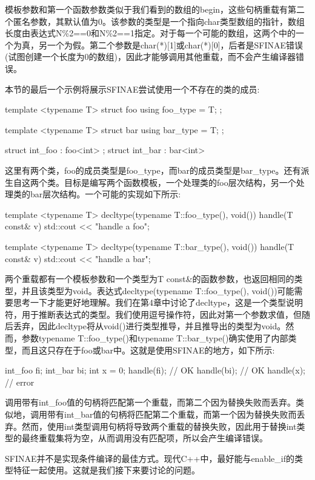 模板参数和第一个函数参数类似于我们看到的数组的begin，这些句柄重载有第二个匿名参数，其默认值为0。该参数的类型是一个指向char类型数组的指针，数组长度由表达式N\%2==0和N\%2==1指定。对于每一个可能的数组，这两个中的一个为真，另一个为假。第二个参数是char(*)[1]或char(*)[0]，后者是SFINAE错误(试图创建一个长度为0的数组)，因此才能够调用其他重载，而不会产生编译器错误。

本节的最后一个示例将展示SFINAE尝试使用一个不存在的类的成员:

\begin{cpp}
template <typename T>
struct foo
{
	using foo_type = T;
};

template <typename T>
struct bar
{
	using bar_type = T;
};

struct int_foo : foo<int> {};
struct int_bar : bar<int> {}
\end{cpp}

这里有两个类，foo的成员类型是foo\_type，而bar的成员类型是bar\_type。还有派生自这两个类。目标是编写两个函数模板，一个处理类的foo层次结构，另一个处理类的bar层次结构。一个可能的实现如下所示:

\begin{cpp}
template <typename T>
decltype(typename T::foo_type(), void()) handle(T const& v)
{
	std::cout << "handle a foo\n";
}

template <typename T>
decltype(typename T::bar_type(), void()) handle(T const& v)
{
	std::cout << "handle a bar\n";
}
\end{cpp}

两个重载都有一个模板参数和一个类型为T const\&的函数参数，也返回相同的类型，并且该类型为void。表达式decltype(typename T::foo\_type(), void())可能需要思考一下才能更好地理解。我们在第4章中讨论了decltype，这是一个类型说明符，用于推断表达式的类型。我们使用逗号操作符，因此对第一个参数求值，但随后丢弃，因此decltype将从void()进行类型推导，并且推导出的类型为void。然而，参数typename T::foo\_type()和typename T::bar\_type()确实使用了内部类型，而且这只存在于foo或bar中。这就是使用SFINAE的地方，如下所示:

\begin{cpp}
int_foo fi;
int_bar bi;
int x = 0;
handle(fi); // OK
handle(bi); // OK
handle(x); // error
\end{cpp}

调用带有int\_foo值的句柄将匹配第一个重载，而第二个因为替换失败而丢弃。类似地，调用带有int\_bar值的句柄将匹配第二个重载，而第一个因为替换失败而丢弃。然而，使用int类型调用句柄将导致两个重载的替换失败，因此用于替换int类型的最终重载集将为空，从而调用没有匹配项，所以会产生编译错误。

SFINAE并不是实现条件编译的最佳方式。现代C++中，最好能与enable\_if的类型特征一起使用。这就是我们接下来要讨论的问题。























